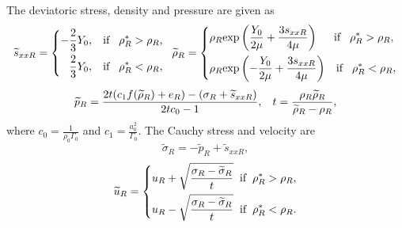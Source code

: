 \documentclass{article}
\numberwithin{equation}{section}
\numberwithin{table}{section}
\begin{document}
The deviatoric stress, density and pressure are given as
\begin{equation}
  \widetilde{s}_{xxR} =\left\{ \begin{aligned}
	  -\frac{2}{3}Y_0, \hspace{0.3cm} \text{if} \hspace{0.3cm} \rho_R^* > \rho_R,\\
	  \frac{2}{3}Y_0, \hspace{0.3cm} \text{if} \hspace{0.3cm} \rho_R^* < \rho_R,\\
	\end{aligned}\right.
	\hspace{0.2cm} \widetilde{\rho}_{R} = \left\{ \begin{aligned}
	  & \rho_R \text{exp}\left(\frac{Y_0}{2\mu}+\frac{3 s_{xxR}}{4\mu}\right)  \hspace{0.5cm} \text{if} \hspace{0.3cm} \rho_R^* > \rho_R,\\
& \rho_R \text{exp}\left(-\frac{Y_0}{2\mu}+\frac{3 s_{xxR}}{4\mu}\right)
\hspace{0.3cm} \text{if} \hspace{0.3cm} \rho_R^* < \rho_R,\\
  \end{aligned}\right.
 \end{equation}
\begin{equation}
  \widetilde{p}_R= \frac{2t(c_1f(\widetilde{\rho}_R)+e_R)-(\sigma_R+\widetilde{s}_{xxR})}{2tc_0-1}, \hspace{0.3cm}
t=\frac{\rho_R \widetilde{\rho}_R}{\widetilde{\rho}_R-\rho_R},
\end{equation}
where $c_0 =\frac{1}{\rho_0 \Gamma_0}$ and $c_1 = \frac{a_0^2}{\Gamma_0}$.
The Cauchy stress and velocity are
\begin{equation}
\widetilde{\sigma}_R = -\widetilde{p}_R+\widetilde{s}_{xxR},
\end{equation}
\begin{equation}
  \widetilde{u}_R= \left\{
  \begin{aligned}
	u_R+\sqrt{\frac{\sigma_R-\widetilde{\sigma}_R}{t}} \hspace{0.2cm} \text{if} \hspace{0.2cm} \rho_R^* >\rho_R,\\
	u_R-\sqrt{\frac{\sigma_R-\widetilde{\sigma}_R}{t}} \hspace{0.2cm} \text{if} \hspace{0.2cm} \rho_R^* <\rho_R.\\
\end{aligned} \right.
\end{equation}
\end{document}
